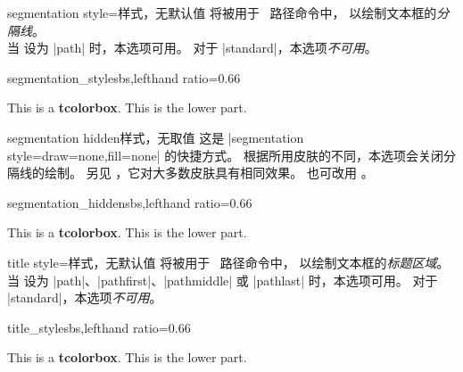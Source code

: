 \clearpage
\begin{docTcbKey}{segmentation style}{=}{样式，无默认值}
  将被用于 \tikzname\ 路径命令中，
  以绘制文本框的\emph{分隔线}。\\
  当  设为 |path| 时，本选项可用。
  对于 |standard|，本选项\emph{不可用}。
\begin{exdispExample*}{segmentation_style}{sbs,lefthand ratio=0.66}

\begin{tcolorbox}[enhanced,title=My title,
  segmentation style={double=white,draw=blue,
                  double distance=1pt,solid}]
This is a \textbf{tcolorbox}.
\tcblower
This is the lower part.
\end{tcolorbox}
\end{exdispExample*}
\end{docTcbKey}


\begin{docTcbKey}{segmentation hidden}{}{样式，无取值}
  这是 |segmentation style={draw=none,fill=none}| 的快捷方式。
  根据所用皮肤的不同，本选项会关闭分隔线的绘制。
  另见 ，它对大多数皮肤具有相同效果。
  也可改用 。
\begin{exdispExample*}{segmentation_hidden}{sbs,lefthand ratio=0.66}

\begin{tcolorbox}[title=My title,
  enhanced,segmentation hidden]
This is a \textbf{tcolorbox}.
\tcblower
This is the lower part.
\end{tcolorbox}
\end{exdispExample*}
\end{docTcbKey}


\begin{docTcbKey}{title style}{=}{样式，无默认值}
  将被用于 \tikzname\ 路径命令中，
  以绘制文本框的\emph{标题区域}。\\
  当  设为
  |path|、|pathfirst|、|pathmiddle| 或 |pathlast| 时，本选项可用。
  对于 |standard|，本选项\emph{不可用}。
\begin{exdispExample*}{title_style}{sbs,lefthand ratio=0.66}

\begin{tcolorbox}[enhanced,title=My title,
  title style={left color=blue!15!yellow,
               right color=red!85!black}]
This is a \textbf{tcolorbox}.
\tcblower
This is the lower part.
\end{tcolorbox}
\end{exdispExample*}
\end{docTcbKey}

